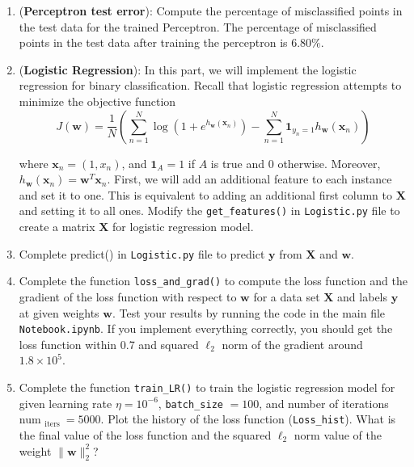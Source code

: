 \documentclass[letterpaper]{article}
\theoremstyle{definition}
\begin{document}
\begin{enumerate}
\begin{enumerate}
\item (\textbf{Perceptron test error}): Compute the percentage of misclassified points in the test data
for the trained Perceptron.
\color{teal}
The percentage of misclassified points in the test data after training the perceptron is
\(6.80\%\).
\color{black}

\item (\textbf{Logistic Regression}): In this part, we will implement the logistic regression for binary
classification. Recall that logistic regression attempts to minimize the objective function
\begin{equation*}
J(\mathbf{w})=\frac{1}{N}
\left(\sum_{n=1}^{N} \log \left(1+e^{h_{\mathbf{w}}\left(\mathbf{x}_{n}\right)}\right)-
\sum_{n=1}^{N} \mathbf{1}_{y_{n}=1} h_{\mathbf{w}}\left(\mathbf{x}_{n}\right)\right) \tag{5}
\end{equation*}

where \(\mathbf{x}_{n}=\left(1, x_{n}\right)\), and \(\mathbf{1}_{A}=1\) if \(A\) is true and 0
otherwise. Moreover,
\(h_{\mathbf{w}}\left(\mathbf{x}_{n}\right)=\mathbf{w}^{T} \mathbf{x}_{n}\).
First, we will add an additional feature to each instance and set it to one.
This is equivalent to adding an additional first column to \(\mathbf{X}\) and
setting it to all ones. Modify the \texttt{get\_features()} in
\texttt{Logistic.py} file to create a matrix \(\mathbf{X}\) for logistic regression model.

\item Complete predict() in \texttt{Logistic.py} file to predict \(\mathbf{y}\) from \(\mathbf{X}\) and
\(\mathbf{w}\).

\item Complete the function \texttt{loss\_and\_grad()} to compute the loss function and the gradient of the
loss function with respect to \(\mathbf{w}\) for a data set \(\mathbf{X}\) and labels
\(\mathbf{y}\) at given weights \(\mathbf{w}\). Test your results by running the code in the
main file \texttt{Notebook.ipynb}. If you implement everything correctly, you should get the loss
function within 0.7 and squared \(\ell_{2}\) norm of the gradient around \(1.8 \times 10^{5}\).

\item Complete the function \texttt{train\_LR()} to train the logistic regression model for given learning
rate \(\eta=10^{-6}\), \texttt{batch\_size} \(=100\), and number of iterations num
\(_{\text {iters }}=5000\). Plot the history of the loss function (\texttt{Loss\_hist}).
What is the final value of the loss function and the squared \(\ell_{2}\) norm value of the
weight \(\|\mathbf{w}\|_{2}^{2}\)?


\end{enumerate}
\end{enumerate}
\end{document}
